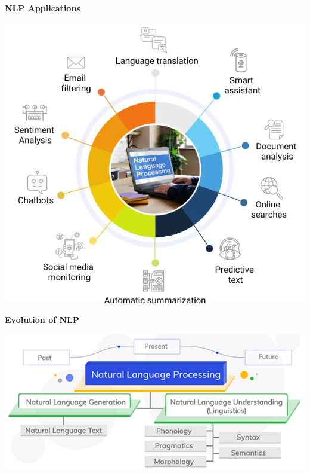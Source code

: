 \documentclass[letterpaper, 10.5pt,landscape]{article}
\begin{document}
\begin{multicols*}{3}
\textbf{NLP Applications}
\vspace{-7pt}
\begin{center}
    \begin{minipage}{0.86\linewidth}
    \includegraphics[width=\textwidth]{figures/nlp_application.png}
    \end{minipage}
\end{center}
\vspace{-7pt}



\textbf{Evolution of NLP}
\vspace{-7pt}
\begin{center}
    \begin{minipage}{\linewidth}
    \includegraphics[width=\textwidth]{figures/nlp_evolution.png}
    \end{minipage}
\end{center}
\vspace{-7pt}


\end{multicols*}
\end{document}
